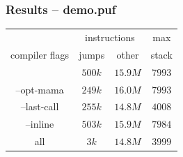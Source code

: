 \documentclass[14pt,xcolor=svgnames]{beamer}
\begin{document}


\begin{frame}
  \frametitle{Results -- demo.puf}
  \begin{center}
    \begin{tabular}{|c|c|c|c|}
      \hline
                    & \multicolumn{2}{|c|}{instructions} & max \\
      \cline{2-4}
      compiler flags& jumps   & other    & stack  \\ \hline
                    & $500k$  & $15.9M$  & $7993$ \\
        --opt-mama  & $249k$  & $16.0M$  & $7993$ \\
        --last-call & $255k$  & $14.8M$  & $4008$ \\
        --inline    & $503k$  & $15.9M$  & $7984$ \\
        all         &   $3k$  & $14.8M$  & $3999$ \\
      \hline
    \end{tabular}
  \end{center}
\end{frame}
\end{document}
